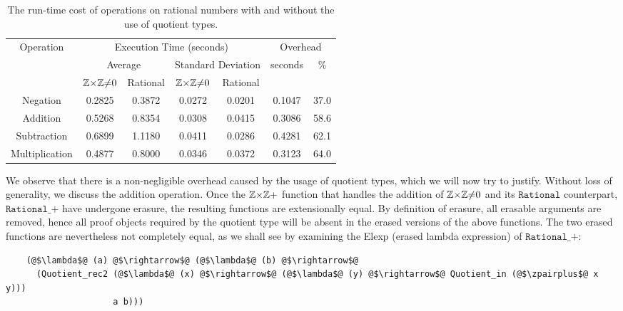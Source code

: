 \documentclass[12pt,twoside,maitrise]{dms}
\theoremstyle{definition}
\numberwithin{equation}{section}
\numberwithin{table}{chapter}
\numberwithin{figure}{chapter}
\newcommand\fn[1] {\texttt{#1}}
\begin{document}
\begin{table}[]
\centering
\begin{tabular}{@{}ccccccc@{}}
\toprule
\multirow{3}{*}{Operation} & \multicolumn{4}{c}{Execution Time (seconds)}                         & \multicolumn{2}{c}{Overhead}                   \\ \cmidrule(l){2-7}
                           & \multicolumn{2}{c}{Average} & \multicolumn{2}{c}{Standard Deviation} & \multirow{2}{*}{seconds} & \multirow{2}{*}{\%} \\
               & $\mathbb{Z}{\times}\mathbb{Z}{\ne}0$ & Rational & $\mathbb{Z}{\times}\mathbb{Z}{\ne}0$ & Rational &        &      \\ \midrule
Negation       & 0.2825   & 0.3872   & 0.0272   & 0.0201   & 0.1047 & 37.0 \\
Addition       & 0.5268   & 0.8354   & 0.0308   & 0.0415   & 0.3086 & 58.6 \\
Subtraction    & 0.6899   & 1.1180   & 0.0411   & 0.0286   & 0.4281 & 62.1 \\
Multiplication & 0.4877   & 0.8000   & 0.0346   & 0.0372   & 0.3123 & 64.0 \\ \bottomrule
\end{tabular}
\caption{The run-time cost of operations on rational numbers with and without the
  use of quotient types.}\label{tab:rational-benchmark}
\end{table}

We observe that there is a non-negligible overhead caused by the usage of
quotient types, which we will now try to justify. Without loss of generality, we
discuss the addition operation. Once the $\mathbb{Z}{\times}\mathbb{Z}+$ function that handles the
addition of $\mathbb{Z}{\times}\mathbb{Z}{\ne}0$ and its $\fn{Rational}$ counterpart, $\fn{Rational\_+}$
have undergone erasure, the resulting functions are extensionally equal. By
definition of erasure\cite{monnier2019typer}, all erasable arguments are
removed, hence all proof objects required by the quotient type will be absent in
the erased versions of the above functions. The two erased functions are
nevertheless not completely equal, as we shall see by examining the Elexp
(erased lambda expression)\cite{delaunay2017implementation} of
$\fn{Rational\_+}$:

\begin{verbatim}
    (@$\lambda$@ (a) @$\rightarrow$@ (@$\lambda$@ (b) @$\rightarrow$@
      (Quotient_rec2 (@$\lambda$@ (x) @$\rightarrow$@ (@$\lambda$@ (y) @$\rightarrow$@ Quotient_in (@$\zpairplus$@ x y)))
                     a b)))
\end{verbatim}
\end{document}
